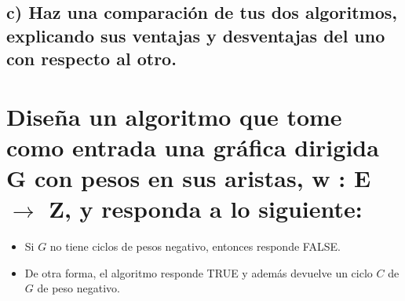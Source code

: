 \documentclass[12pt]{article}
\begin{document}
\subsection{c) Haz una comparación de tus dos algoritmos, explicando sus ventajas y desventajas del uno con respecto al otro.}
\section{Diseña un algoritmo que tome como entrada una gráfica dirigida G con pesos en sus aristas, w : E  $\rightarrow$ Z, y responda a lo siguiente:}
\begin{itemize}
	\item Si $G$ no tiene ciclos de pesos negativo, entonces responde FALSE.
	\item De otra forma, el algoritmo responde TRUE y además devuelve un ciclo $C$ de $G$ de peso negativo.
\end{itemize}
\end{document}
